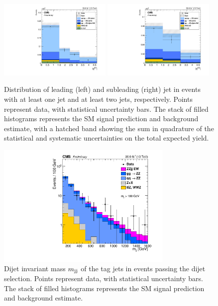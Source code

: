 \begin{figure}[htbp]
  \begin{center}
    \includegraphics[width=0.48\textwidth]{results/j1Eta.pdf}
    \includegraphics[width=0.48\textwidth]{results/j2Eta.pdf}
    \caption[Pseudorapidity of the leading and subleading jets]{
        Distribution of leading (left) and subleading (right) jet {\abseta} in {\ZZ} events with at least one jet and at least two jets, respectively.
        Points represent data, with statistical uncertainty bars.
        The stack of filled histograms represents the SM signal prediction and background estimate, with a hatched band showing the sum in quadrature of the statistical and systematic uncertainties on the total expected yield.
      }\label{fig:jetEta}
  \end{center}
\end{figure}

\begin{figure}[htbp]
  \begin{center}
    \includegraphics[width=0.75\textwidth]{results/mjj.pdf}
    \caption[Dijet invariant mass]{
        Dijet invariant mass $m_{\mathrm{j}\mathrm{j}}$ of the tag jets in {\ZZ} events passing the dijet selection.
        Points represent data, with statistical uncertainty bars.
        The stack of filled histograms represents the SM signal prediction and background estimate.
      }\label{fig:mjj}
  \end{center}
\end{figure}

